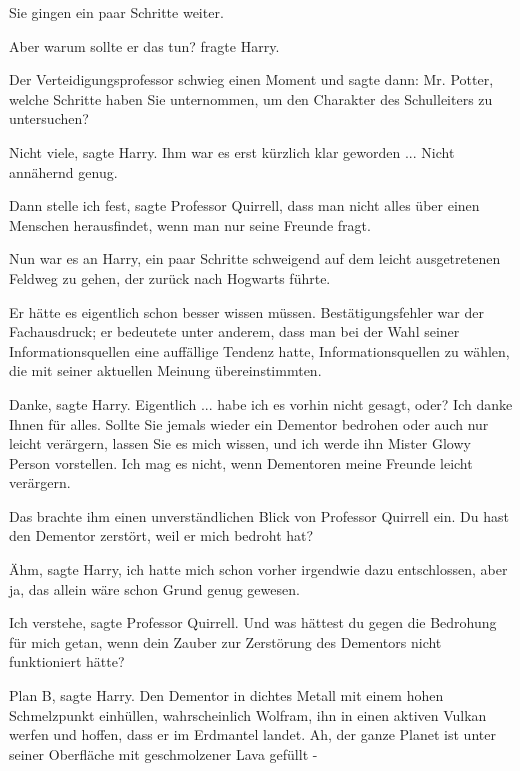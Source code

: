 Sie gingen ein paar Schritte weiter.

\glqq{}Aber warum sollte er das tun?\grqq{} fragte Harry.

Der Verteidigungsprofessor schwieg einen Moment und sagte dann: \glqq{}Mr.
Potter, welche Schritte haben Sie unternommen, um den Charakter des Schulleiters
zu untersuchen?\grqq{}

\glqq{}Nicht viele\grqq{}, sagte Harry. Ihm war es erst kürzlich klar geworden ...
\glqq{}Nicht annähernd genug.\grqq{}

\glqq{}Dann stelle ich fest\grqq{}, sagte Professor Quirrell, \glqq{}dass man
nicht alles über einen Menschen herausfindet, wenn man nur seine Freunde fragt.\grqq{}

Nun war es an Harry, ein paar Schritte schweigend auf dem leicht ausgetretenen
Feldweg zu gehen, der zurück nach Hogwarts führte.

Er hätte es eigentlich schon besser wissen müssen. Bestätigungsfehler war der
Fachausdruck; er bedeutete unter anderem, dass man bei der Wahl seiner
Informationsquellen eine auffällige Tendenz hatte, Informationsquellen zu
wählen, die mit seiner aktuellen Meinung übereinstimmten.

\glqq{}Danke\grqq{}, sagte Harry. \glqq{}Eigentlich ... habe ich es vorhin nicht
gesagt, oder? Ich danke Ihnen für alles. Sollte Sie jemals wieder ein Dementor
bedrohen oder auch nur leicht verärgern, lassen Sie es mich wissen, und ich
werde ihn Mister Glowy Person vorstellen. Ich mag es nicht, wenn Dementoren
meine Freunde leicht verärgern.\grqq{}

Das brachte ihm einen unverständlichen Blick von Professor Quirrell ein. \glqq{}
Du hast den Dementor zerstört, weil er mich bedroht hat?\grqq{}

\glqq{}Ähm\grqq{}, sagte Harry, \glqq{}ich hatte mich schon vorher irgendwie dazu
entschlossen, aber ja, das allein wäre schon Grund genug gewesen.\grqq{}

\glqq{}Ich verstehe\grqq{}, sagte Professor Quirrell. \glqq{}Und was hättest du
gegen die Bedrohung für mich getan, wenn dein Zauber zur Zerstörung des
Dementors nicht funktioniert hätte?\grqq{}

\glqq{}Plan B\grqq{}, sagte Harry. \glqq{}Den Dementor in dichtes Metall mit einem
hohen Schmelzpunkt einhüllen, wahrscheinlich Wolfram, ihn in einen aktiven
Vulkan werfen und hoffen, dass er im Erdmantel landet. Ah, der ganze Planet ist
unter seiner Oberfläche mit geschmolzener Lava gefüllt -\grqq{}

